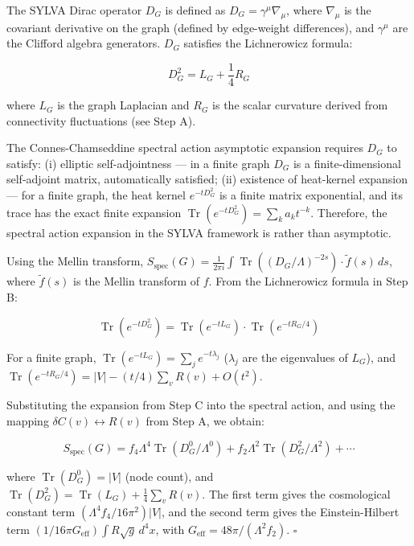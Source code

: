 \documentclass[11pt,a4paper]{article}
\theoremstyle{plain}
\theoremstyle{definition}
\begin{document}
\textbf{\1}

The SYLVA Dirac operator $D_G$ is defined as $D_G = \gamma^\mu \nabla_\mu$, where $\nabla_\mu$ is the covariant derivative on the graph (defined by edge-weight differences), and $\gamma^\mu$ are the Clifford algebra generators. $D_G$ satisfies the Lichnerowicz formula:

\[D_G^2 = L_G + \frac{1}{4} R_G\]

where $L_G$ is the graph Laplacian and $R_G$ is the scalar curvature derived from connectivity fluctuations (see Step A).

The Connes-Chamseddine spectral action asymptotic expansion requires $D_G$ to satisfy: (i) elliptic self-adjointness — in a finite graph $D_G$ is a finite-dimensional self-adjoint matrix, automatically satisfied; (ii) existence of heat-kernel expansion — for a finite graph, the heat kernel $e^{-tD_G^2}$ is a finite matrix exponential, and its trace has the exact finite expansion $\operatorname{Tr}(e^{-tD_G^2}) = \sum_k a_k t^{-k}$. Therefore, the spectral action expansion in the SYLVA framework is \textbf{\1} rather than asymptotic.

\textbf{\1}

Using the Mellin transform, $S_{\text{spec}}(G) = \frac{1}{2\pi i} \int \operatorname{Tr}((D_G/\Lambda)^{-2s}) \cdot \tilde{f}(s) \, ds$, where $\tilde{f}(s)$ is the Mellin transform of $f$. From the Lichnerowicz formula in Step B:

\[\operatorname{Tr}(e^{-tD_G^2}) = \operatorname{Tr}(e^{-tL_G}) \cdot \operatorname{Tr}(e^{-tR_G/4})\]

For a finite graph, $\operatorname{Tr}(e^{-tL_G}) = \sum_j e^{-t\lambda_j}$ ($\lambda_j$ are the eigenvalues of $L_G$), and $\operatorname{Tr}(e^{-tR_G/4}) = |V| - (t/4) \sum_v R(v) + O(t^2)$.

\textbf{\1}

Substituting the expansion from Step C into the spectral action, and using the mapping $\delta C(v) \leftrightarrow R(v)$ from Step A, we obtain:

\[S_{\text{spec}}(G) = f_4 \Lambda^4 \operatorname{Tr}(D_G^0/\Lambda^0) + f_2 \Lambda^2 \operatorname{Tr}(D_G^2/\Lambda^2) + \cdots\]

where $\operatorname{Tr}(D_G^0) = |V|$ (node count), and $\operatorname{Tr}(D_G^2) = \operatorname{Tr}(L_G) + \frac{1}{4} \sum_v R(v)$. The first term gives the cosmological constant term $(\Lambda^4 f_4 / 16\pi^2) |V|$, and the second term gives the Einstein-Hilbert term $(1/16\pi G_{\text{eff}}) \int R\sqrt{g} \, d^4x$, with $G_{\text{eff}} = 48\pi / (\Lambda^2 f_2)$. \textbf{\1} $\square$
\end{document}
